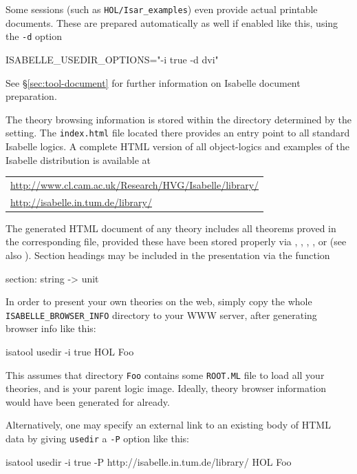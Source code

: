 Some sessions (such as \texttt{HOL/Isar_examples}) even provide actual
printable documents.  These are prepared automatically as well if enabled like
this, using the \texttt{-d} option
\begin{ttbox}
ISABELLE_USEDIR_OPTIONS="-i true -d dvi"
\end{ttbox}
See \S\ref{sec:tool-document} for further information on Isabelle document
preparation.

\bigskip The theory browsing information is stored within the directory
determined by the  setting.  The
\texttt{index.html} file located there provides an entry point to all standard
Isabelle logics.  A complete HTML version of all object-logics and examples of
the Isabelle distribution is available at
\begin{center}\small
  \begin{tabular}{l}
    \url{http://www.cl.cam.ac.uk/Research/HVG/Isabelle/library/} \\
    \url{http://isabelle.in.tum.de/library/} \\
  \end{tabular}
\end{center}

\medskip

The generated HTML document of any theory includes all theorems proved in the
corresponding {\ML} file, provided these have been stored properly via
, , , ,
 or  (see also \cite{isabelle-ref}).
Section headings may be included in the presentation via the {\ML} function
\begin{ttbox}
section: string -> unit
\end{ttbox}

\medskip

In order to present your own theories on the web, simply copy the whole
\texttt{ISABELLE_BROWSER_INFO} directory to your WWW server, after generating
browser info like this:
\begin{ttbox}
isatool usedir -i true HOL Foo
\end{ttbox}
This assumes that directory \texttt{Foo} contains some \texttt{ROOT.ML} file
to load all your theories, and {\HOL} is your parent logic image.  Ideally,
theory browser information would have been generated for {\HOL} already.

Alternatively, one may specify an external link to an existing body of HTML
data by giving \texttt{usedir} a \texttt{-P} option like this:
\begin{ttbox}
isatool usedir -i true -P http://isabelle.in.tum.de/library/ HOL Foo
\end{ttbox}



